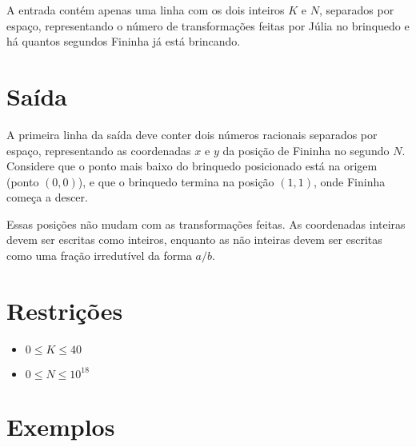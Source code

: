 A entrada contém apenas uma linha com os dois inteiros $K$ e $N$, separados por espaço, representando o número de transformações feitas por Júlia no brinquedo e há quantos segundos Fininha já está brincando.


\section*{Saída}

A primeira linha da saída deve conter dois números racionais separados por espaço,  representando as coordenadas $x$ e $y$ da posição de Fininha no segundo $N$.
 Considere que o ponto mais baixo do brinquedo
posicionado está na origem (ponto $(0, 0)$), e que o brinquedo termina na posição $(1, 1)$, onde Fininha começa a descer.

Essas posições não mudam com as transformações feitas.
 As coordenadas inteiras devem ser escritas como inteiros, enquanto as não inteiras devem ser escritas como uma fração irredutível da forma $a/b$.

\section*{Restrições}

\begin{itemize}
\item $0 \leq K \leq 40$
\item $0 \leq N \leq 10^{18}$
\end{itemize}
\section*{Exemplos}
\exemplo
